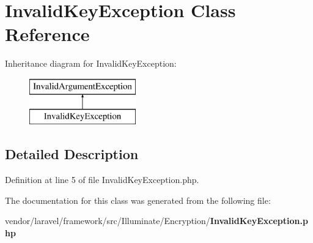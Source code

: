 \section{Invalid\+Key\+Exception Class Reference}
\label{class_illuminate_1_1_encryption_1_1_invalid_key_exception}
Inheritance diagram for Invalid\+Key\+Exception\+:\begin{figure}[H]
\begin{center}
\leavevmode
\includegraphics[height=2.000000cm]{class_illuminate_1_1_encryption_1_1_invalid_key_exception}
\end{center}
\end{figure}


\subsection{Detailed Description}


Definition at line 5 of file Invalid\+Key\+Exception.\+php.



The documentation for this class was generated from the following file\+:\begin{DoxyCompactItemize}
\item 
vendor/laravel/framework/src/\+Illuminate/\+Encryption/{\bf Invalid\+Key\+Exception.\+php}\end{DoxyCompactItemize}
